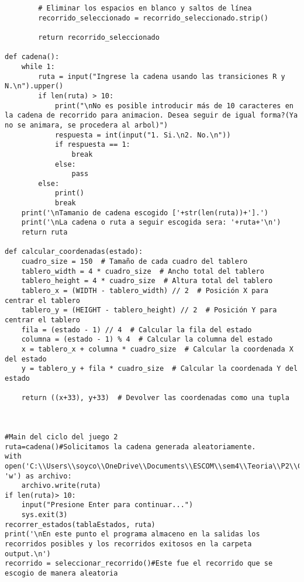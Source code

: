 \begin{lstlisting}
        # Eliminar los espacios en blanco y saltos de línea
        recorrido_seleccionado = recorrido_seleccionado.strip()
        
        return recorrido_seleccionado

def cadena():
    while 1:
        ruta = input("Ingrese la cadena usando las transiciones R y N.\n").upper()
        if len(ruta) > 10:
            print("\nNo es posible introducir más de 10 caracteres en la cadena de recorrido para animacion. Desea seguir de igual forma?(Ya no se animara, se procedera al arbol)")
            respuesta = int(input("1. Si.\n2. No.\n"))
            if respuesta == 1:
                break
            else:
                pass
        else:
            print()
            break
    print('\nTamanio de cadena escogido ['+str(len(ruta))+'].')
    print('\nLa cadena o ruta a seguir escogida sera: '+ruta+'\n')
    return ruta

def calcular_coordenadas(estado):
    cuadro_size = 150  # Tamaño de cada cuadro del tablero
    tablero_width = 4 * cuadro_size  # Ancho total del tablero
    tablero_height = 4 * cuadro_size  # Altura total del tablero
    tablero_x = (WIDTH - tablero_width) // 2  # Posición X para centrar el tablero
    tablero_y = (HEIGHT - tablero_height) // 2  # Posición Y para centrar el tablero
    fila = (estado - 1) // 4  # Calcular la fila del estado
    columna = (estado - 1) % 4  # Calcular la columna del estado
    x = tablero_x + columna * cuadro_size  # Calcular la coordenada X del estado
    y = tablero_y + fila * cuadro_size  # Calcular la coordenada Y del estado
    
    return ((x+33), y+33)  # Devolver las coordenadas como una tupla



#Main del ciclo del juego 2
ruta=cadena()#Solicitamos la cadena generada aleatoriamente.
with open('C:\\Users\\soyco\\OneDrive\\Documents\\ESCOM\\sem4\\Teoria\\P2\\Chess\\output\\ruta_blanca.txt', 'w') as archivo:
    archivo.write(ruta)
if len(ruta)> 10:
    input("Presione Enter para continuar...")
    sys.exit(3)    
recorrer_estados(tablaEstados, ruta)
print('\nEn este punto el programa almaceno en la salidas los recorridos posibles y los recorridos exitosos en la carpeta output.\n')
recorrido = seleccionar_recorrido()#Este fue el recorrido que se escogio de manera aleatoria


\end{lstlisting}
